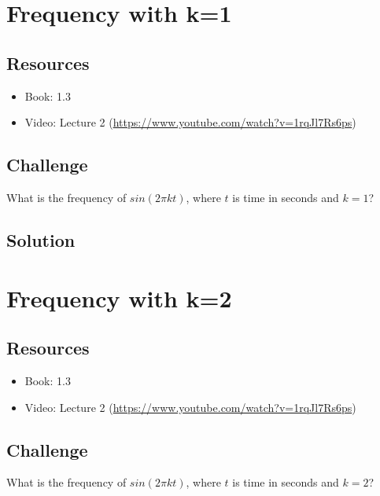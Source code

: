 



\newpage

\section{Frequency with k=1}

\subsection*{Resources}
\begin{itemize}
    \item Book: 1.3
    \item Video: Lecture 2 (\url{https://www.youtube.com/watch?v=1rqJl7Rs6ps})
\end{itemize}

\subsection*{Challenge}
What is the frequency of $sin(2 \pi k t)$, where $t$ is time in seconds and $k=1$?

\subsection*{Solution}





\newpage

\section{Frequency with k=2}

\subsection*{Resources}
\begin{itemize}
    \item Book: 1.3
    \item Video: Lecture 2 (\url{https://www.youtube.com/watch?v=1rqJl7Rs6ps})
\end{itemize}

\subsection*{Challenge}
What is the frequency of $sin(2 \pi k t)$, where $t$ is time in seconds and $k=2$?

